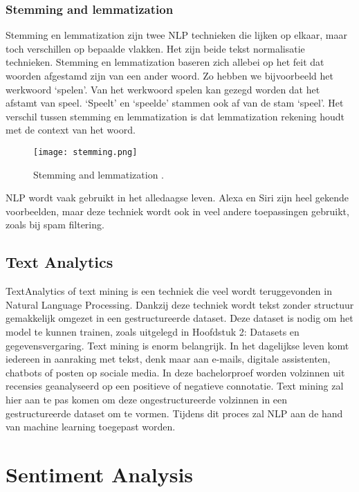 \subsubsection{Stemming and lemmatization}
\label{sec:stemming}

Stemming en lemmatization zijn twee NLP technieken die lijken op elkaar, maar toch verschillen op bepaalde vlakken. Het zijn beide tekst normalisatie technieken. Stemming en lemmatization baseren zich allebei op het feit dat woorden afgestamd zijn van een ander woord. Zo hebben we bijvoorbeeld het werkwoord ‘spelen’. Van het werkwoord spelen kan gezegd worden dat het afstamt van speel. ‘Speelt’ en ‘speelde’ stammen ook af van de stam ‘speel’. Het verschil tussen stemming en lemmatization is dat lemmatization rekening houdt met de context van het woord. \autocite{sas2020}

\begin{figure}[!htbp]
    \texttt{[image: stemming.png]}
    \caption{\label{stemming}Stemming and lemmatization \autocite{sas2020}.}
\end{figure}
\FloatBarrier

NLP wordt vaak gebruikt in het alledaagse leven. Alexa en Siri zijn heel gekende voorbeelden, maar deze techniek wordt ook in veel andere toepassingen gebruikt, zoals bij spam filtering. 

\subsection{Text Analytics}
\label{sec:textanalytics}

\gls{TextAnalytics} of text mining is een techniek die veel wordt teruggevonden in Natural Language Processing. Dankzij deze techniek wordt tekst zonder structuur gemakkelijk omgezet in een gestructureerde dataset. \autocite{Linguamatics2021} Deze dataset is nodig om het model te kunnen trainen, zoals uitgelegd in Hoofdstuk 2: Datasets en gegevensvergaring.
Text mining is enorm belangrijk. In het dagelijkse leven komt iedereen in aanraking met tekst, denk maar aan e-mails, digitale assistenten, chatbots of posten op sociale media. In deze bachelorproef worden volzinnen uit recensies geanalyseerd op een positieve of negatieve connotatie. Text mining zal hier aan te pas komen om deze ongestructureerde volzinnen in een gestructureerde dataset om te vormen. Tijdens dit proces zal NLP aan de hand van machine learning toegepast worden. 

\section{Sentiment Analysis}
\label{sec:sentimentanalysis}


